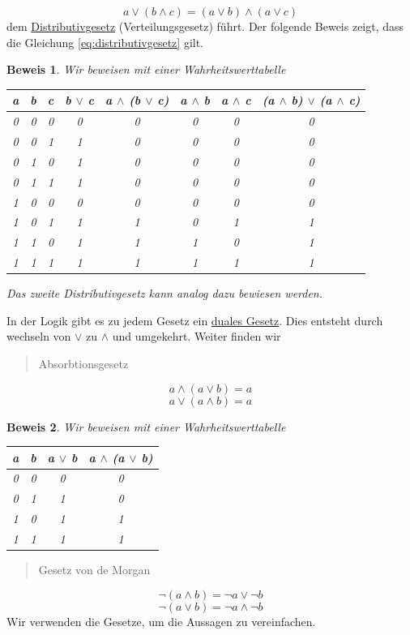 \documentclass{report}
\newtheorem{myproof}{Beweis}
\begin{document}
\begin{equation}a \lor (b \land c) = (a \lor b) \land (a \lor c)\end{equation}
dem \underline{Distributivgesetz} (Verteilungsgesetz) führt. Der folgende Beweis zeigt, dass die Gleichung \ref{eq:distributivgesetz} gilt.
\begin{myproof}Wir beweisen mit einer Wahrheitswerttabelle
\begin{center}\begin{tabular}{c c c | c c c c c}
a & b & c & b \(\lor\) c & a \(\land\) (b \(\lor\) c) & a \(\land\) b & a \(\land\) c & (a \(\land\) b) \(\lor\) (a \(\land\) c)  \\
\hline
0 & 0 & 0 & 0 & 0 & 0 & 0 & 0  \\
0 & 0 & 1 & 1 & 0 & 0 & 0 & 0  \\
0 & 1 & 0 & 1 & 0 & 0 & 0 & 0 \\
0 & 1 & 1 & 1 & 0 & 0 & 0 & 0 \\
1 & 0 & 0 & 0 & 0 & 0 & 0 & 0 \\
1 & 0 & 1 & 1 & 1 & 0 & 1 & 1 \\
1 & 1 & 0 & 1 & 1 & 1 & 0 & 1 \\
1 & 1 & 1 & 1 & 1 & 1 & 1 & 1 \\
\end{tabular}\end{center}
Das zweite Distributivgesetz kann analog dazu bewiesen werden.\end{myproof}
In der Logik gibt es zu jedem Gesetz ein \underline{duales Gesetz}. Dies entsteht durch wechseln von \(\lor\) zu \(\land\) und umgekehrt. Weiter finden wir
\begin{quote}Absorbtionsgesetz\end{quote}
\begin{equation}a \land (a \lor b) = a\end{equation}
\begin{equation}a \lor (a \land b) = a\end{equation}
\begin{myproof}Wir beweisen mit einer Wahrheitswerttabelle
\begin{center}\begin{tabular}{c c | c c}
a & b & a \(\lor\) b & a \(\land\) (a \(\lor\) b) \\
\hline
0 & 0 & 0 & 0  \\
0 & 1 & 1 & 0  \\
1 & 0 & 1 & 1  \\
1 & 1 & 1 & 1 \\
\end{tabular}\end{center}\end{myproof}
\begin{quote}Gesetz von de Morgan\end{quote}
\begin{equation}\lnot (a \land b) = \lnot a \lor \lnot b\end{equation}
\begin{equation}\lnot (a \lor b) = \lnot a \land \lnot b\end{equation}
Wir verwenden die Gesetze, um die Aussagen zu vereinfachen.
\end{document}
